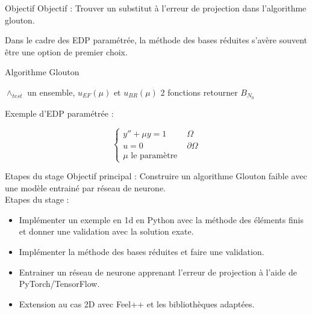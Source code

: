 \documentclass[10pt]{beamer}
\begin{document}

\begin{frame}{Objectif}
Objectif : Trouver un substitut à l'erreur de projection dans l'algorithme glouton.

Dans le cadre des EDP paramétrée, la méthode des bases réduites  s'avère souvent être une option de premier choix.
\noindent%
\begin{minipage}{.65\textwidth}%
\begin{block}{Algorithme Glouton}
\begin{algorithm}
\begin{algorithmic}
\REQUIRE $\wedge_{test}$ un ensemble, $u_{EF}(\mu)$ et $u_{BR}(\mu)$ 2 fonctions
\ENDFOR
\ENSURE retourner $B_{N_0}$ \\
\end{algorithmic}
\end{algorithm}
\end{block}
\end{minipage}%
\hfill
\begin{minipage}{.3\textwidth}%

Exemple d'EDP paramétrée :

$$
\begin{cases} 
 y'' + \mu y = 1  & \Omega   \\
u = 0  & \partial \Omega  \\
\mu  \text{ le paramètre  }
\end{cases}
$$

\end{minipage}%
\end{frame}





\begin{frame}{Etapes du stage}
\noindent Objectif principal : Construire un algorithme Glouton faible avec une modèle entrainé par réseau de neurone. \\

\noindent Etapes du stage : 
        \begin{itemize}
            \item Implémenter un exemple en 1d en Python avec la méthode des éléments finis et donner une validation avec la solution exate.
            \item Implémenter la méthode des bases réduites et faire une validation.
            \item Entrainer un réseau de neurone apprenant l'erreur de projection à l'aide de PyTorch/TensorFlow.
            \item Extension au cas 2D avec Feel++ et les bibliothèques adaptées.
        \end{itemize}
\end{frame}
\end{document}
